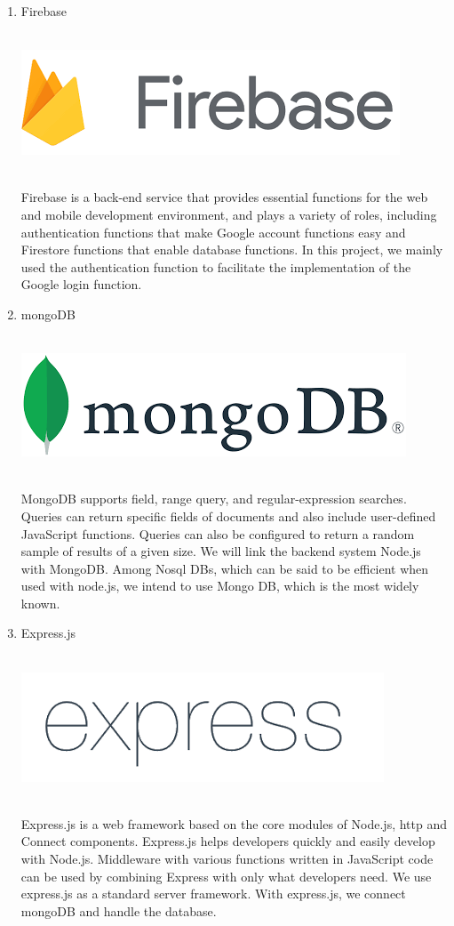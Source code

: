 \documentclass[conference]{IEEEtran}
\begin{document}
\begin{enumerate}
	\item{Firebase}\\
	\\
	\centerline{\includegraphics[scale=0.4]{pics/Firebase.png}}\\
Firebase is a back-end service that provides essential functions for the web and mobile development environment, and plays a variety of roles, including authentication functions that make Google account functions easy and Firestore functions that enable database functions. In this project, we mainly used the authentication function to facilitate the implementation of the Google login function.\\
	\item{mongoDB}\\
	\\
	\centerline{\includegraphics[scale=0.4]{pics/mongo.png}}\\
MongoDB supports field, range query, and regular-expression searches. Queries can return specific fields of documents and also include user-defined JavaScript functions. Queries can also be configured to return a random sample of results of a given size. We will link the backend system Node.js with MongoDB. Among Nosql DBs, which can be said to be efficient when used with node.js, we intend to use Mongo DB, which is the most widely known.\\
	\item{Express.js}\\
	\\
	\centerline{\includegraphics[scale=0.4]{pics/express.png}}\\
Express.js is a web framework based on the core modules of Node.js, http and Connect components. Express.js helps developers quickly and easily develop with Node.js. Middleware with various functions written in JavaScript code can be used by combining Express with only what developers need. We use express.js as a standard server framework. With express.js, we connect mongoDB and handle the database.
\end{enumerate}
\end{document}
